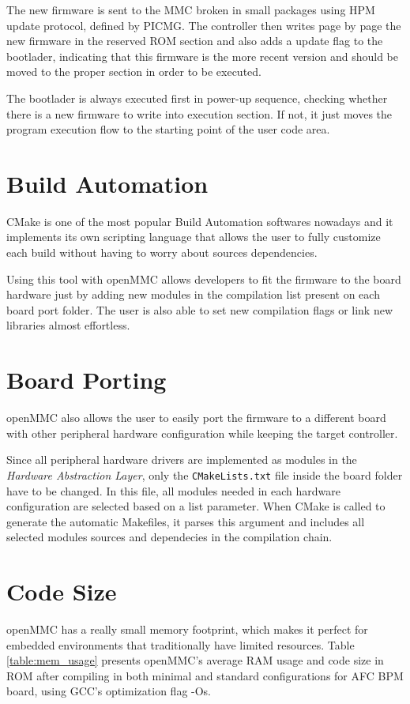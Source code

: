 \documentclass[a4paper,
              ]{jacow}
\begin{document}
The new firmware is sent to the MMC broken in small packages using HPM update protocol, defined by PICMG.
The controller then writes page by page the new firmware in the reserved ROM section and also adds a update flag to the bootlader, indicating that this firmware is the more recent version and should be moved to the proper section in order to be executed.

The bootlader is always executed first in power-up sequence, checking whether there is a new firmware to write into execution section. If not, it just moves the program execution flow to the starting point of the user code area.

\section{Build Automation}
CMake is one of the most popular Build Automation softwares nowadays and it implements its own scripting language that allows the user to fully customize each build without having to worry about sources dependencies.

Using this tool with openMMC allows developers to fit the firmware to the board hardware just by adding new modules in the compilation list present on each board port folder.
The user is also able to set new compilation flags or link new libraries almost effortless.

\section{Board Porting}
openMMC also allows the user to easily port the firmware to a different board with other peripheral hardware configuration while keeping the target controller.

Since all peripheral hardware drivers are implemented as modules in the \emph{Hardware Abstraction Layer}, only the \texttt{CMakeLists.txt} file inside the board folder have to be changed. In this file, all modules needed in each hardware configuration are selected based on a list parameter. When CMake is called to generate the automatic Makefiles, it parses this argument and includes all selected modules sources and dependecies in the compilation chain.

\section{Code Size}
openMMC has a really small memory footprint, which makes it perfect for embedded environments that traditionally have limited resources.
Table \ref{table:mem_usage} presents openMMC's average RAM usage and code size in ROM after compiling in both minimal and standard configurations for AFC BPM board, using GCC's optimization flag -Os.
\end{document}
